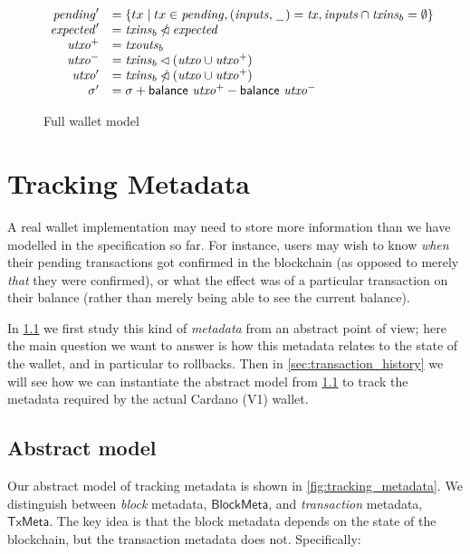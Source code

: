 \documentclass{article}
\newcommand{\restrictdom}{\lhd}
\newcommand{\subtractdom}{\mathbin{\slashed{\restrictdom}}}
\theoremstyle{definition}{
  \newtheorem{lemma}{Lemma}[section] %
  \newtheorem{definition}[lemma]{Definition}
}
\theoremstyle{theorem}{
  \newtheorem{invariant}[lemma]{Invariant}
  \newtheorem{proofobligation}[lemma]{Proof Obligation}
}
\numberwithin{equation}{lemma}
\begin{document}
\begin{figure}
\begin{align*}
\begin{array}[t]{rl}
     \mathit{pending}'  & = \{ tx \mid tx \in \mathit{pending}, (\mathit{inputs}, \,\underline{\phantom{a}}\,) = \mathit{tx}, \mathit{inputs} \cap \mathit{txins}_b = \emptyset \} \\
     \mathit{expected}' & = \mathit{txins}_b \subtractdom \mathit{expected} \\
     \mathit{utxo}^+    & = \mathit{txouts}_b \\
     \mathit{utxo}^-    & = \mathit{txins}_b \restrictdom (\mathit{utxo} \cup \mathit{utxo}^+) \\
     \mathit{utxo}'     & = \mathit{txins}_b \subtractdom (\mathit{utxo} \cup \mathit{utxo}^+) \\
     \sigma'            & = \sigma + \mathsf{balance} ~ \mathit{utxo}^+ - \mathsf{balance} ~ \mathit{utxo}^-
   \end{array}
\end{align*}

\caption{\label{fig:full_wallet_model}Full wallet model}
\end{figure}

\section{Tracking Metadata}

A real wallet implementation may need to store more information than
we have modelled in the specification so far. For instance, users may wish to
know \emph{when} their pending transactions got confirmed in the blockchain
(as opposed to merely \emph{that} they were confirmed), or what the effect
was of a particular transaction on their balance (rather than merely being
able to see the current balance).

In \cref{sec:abstract_metadata} we first study this kind of \emph{metadata}
from an abstract point of view; here the main question we want to answer is
how this metadata relates to the state of the wallet, and in particular to
rollbacks. Then in \cref{sec:transaction_history} we will see how
we can instantiate the abstract model from \cref{sec:abstract_metadata}
to track the metadata required by the actual Cardano (V1) wallet.

\subsection{Abstract model}
\label{sec:abstract_metadata}

Our abstract model of tracking metadata is shown in
\cref{fig:tracking_metadata}. We distinguish between \emph{block}
metadata, $\mathsf{BlockMeta}$, and \emph{transaction} metadata,
$\mathsf{TxMeta}$. The key idea is that the block metadata depends on the
state of the blockchain, but the transaction metadata does not. Specifically:
\end{document}
